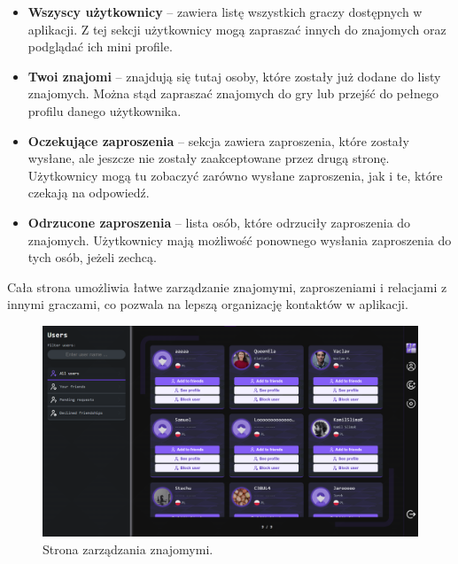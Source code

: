 \documentclass[12pt,a4paper]{article}
\begin{document}
\begin{itemize}
    \item \textbf{Wszyscy użytkownicy} – zawiera listę wszystkich graczy dostępnych w aplikacji. Z tej sekcji użytkownicy mogą zapraszać innych do znajomych oraz podglądać ich mini profile.
    
    \item \textbf{Twoi znajomi} – znajdują się tutaj osoby, które zostały już dodane do listy znajomych. Można stąd zapraszać znajomych do gry lub przejść do pełnego profilu danego użytkownika.
    
    \item \textbf{Oczekujące zaproszenia} – sekcja zawiera zaproszenia, które zostały wysłane, ale jeszcze nie zostały zaakceptowane przez drugą stronę. Użytkownicy mogą tu zobaczyć zarówno wysłane zaproszenia, jak i te, które czekają na odpowiedź.
    
    \item \textbf{Odrzucone zaproszenia} – lista osób, które odrzuciły zaproszenia do znajomych. Użytkownicy mają możliwość ponownego wysłania zaproszenia do tych osób, jeżeli zechcą.
\end{itemize}

Cała strona umożliwia łatwe zarządzanie znajomymi, zaproszeniami i relacjami z innymi graczami, co pozwala na lepszą organizację kontaktów w aplikacji.

\begin{figure}[h!]
    \centering
    \includegraphics[width=1\textwidth]{zdj/ins_users.png}
    \caption{Strona zarządzania znajomymi.}
\end{figure}

\newpage
\end{document}
